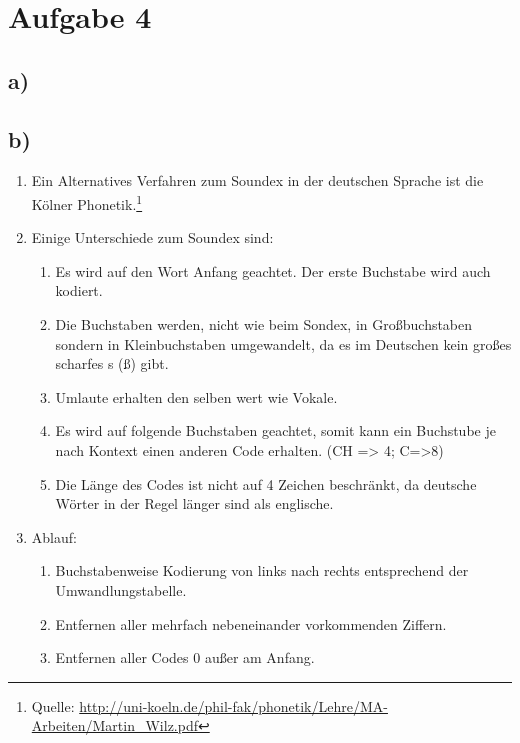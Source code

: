 \section*{Aufgabe 4}
\subsection*{a)}

\subsection*{b)}

\begin{enumerate}
\item Ein Alternatives Verfahren zum Soundex in der deutschen Sprache ist die Kölner Phonetik.\footnote{Quelle: \url{http://uni-koeln.de/phil-fak/phonetik/Lehre/MA-Arbeiten/Martin_Wilz.pdf}}
\item Einige Unterschiede zum Soundex sind:
	\begin{enumerate}
		\item Es wird auf den Wort Anfang geachtet. Der erste Buchstabe wird auch kodiert. 
		\item Die Buchstaben werden, nicht wie beim Sondex, in Großbuchstaben sondern in Kleinbuchstaben umgewandelt, da es im Deutschen kein großes scharfes s (ß) gibt.
		\item Umlaute erhalten den selben wert wie Vokale.
		\item Es wird auf folgende Buchstaben geachtet, somit kann ein Buchstube je nach Kontext einen anderen Code erhalten. (CH => 4; C=>8)
		\item Die Länge des Codes ist nicht auf 4 Zeichen beschränkt, da deutsche Wörter in der Regel länger sind als englische. 
	\end{enumerate}
\item Ablauf:
	\begin{enumerate}
	\item Buchstabenweise Kodierung von links nach rechts entsprechend der Umwandlungstabelle. 
	\item Entfernen aller mehrfach nebeneinander vorkommenden Ziffern.
	\item Entfernen aller Codes 0 außer am Anfang.
	\end{enumerate}

\end{enumerate}

